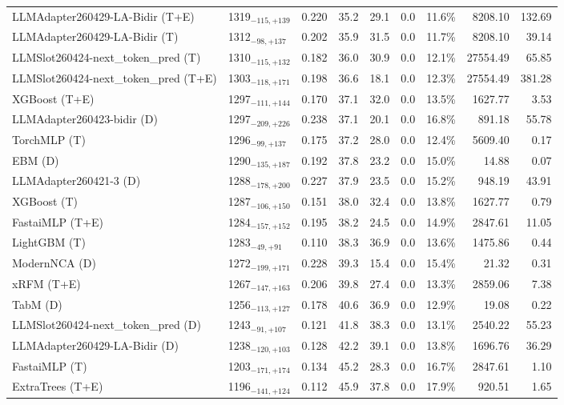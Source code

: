 \begin{tabular}{llcccccrr}
LLMAdapter260429-LA-Bidir (T+E) & 1319${}_{-115,+139}$ & 0.220 & 35.2 & 29.1 & 0.0 & 11.6\% & 8208.10 & 132.69 \\
LLMAdapter260429-LA-Bidir (T) & 1312${}_{-98,+137}$ & 0.202 & 35.9 & 31.5 & 0.0 & 11.7\% & 8208.10 & 39.14 \\
LLMSlot260424-next_token_pred (T) & 1310${}_{-115,+132}$ & 0.182 & 36.0 & 30.9 & 0.0 & 12.1\% & 27554.49 & 65.85 \\
LLMSlot260424-next_token_pred (T+E) & 1303${}_{-118,+171}$ & 0.198 & 36.6 & 18.1 & 0.0 & 12.3\% & 27554.49 & 381.28 \\
XGBoost (T+E) & 1297${}_{-111,+144}$ & 0.170 & 37.1 & 32.0 & 0.0 & 13.5\% & 1627.77 & 3.53 \\
LLMAdapter260423-bidir (D) & 1297${}_{-209,+226}$ & 0.238 & 37.1 & 20.1 & 0.0 & 16.8\% & 891.18 & 55.78 \\
TorchMLP (T) & 1296${}_{-99,+137}$ & 0.175 & 37.2 & 28.0 & 0.0 & 12.4\% & 5609.40 & 0.17 \\
EBM (D) & 1290${}_{-135,+187}$ & 0.192 & 37.8 & 23.2 & 0.0 & 15.0\% & 14.88 & 0.07 \\
LLMAdapter260421-3 (D) & 1288${}_{-178,+200}$ & 0.227 & 37.9 & 23.5 & 0.0 & 15.2\% & 948.19 & 43.91 \\
XGBoost (T) & 1287${}_{-106,+150}$ & 0.151 & 38.0 & 32.4 & 0.0 & 13.8\% & 1627.77 & 0.79 \\
FastaiMLP (T+E) & 1284${}_{-157,+152}$ & 0.195 & 38.2 & 24.5 & 0.0 & 14.9\% & 2847.61 & 11.05 \\
LightGBM (T) & 1283${}_{-49,+91}$ & 0.110 & 38.3 & 36.9 & 0.0 & 13.6\% & 1475.86 & 0.44 \\
ModernNCA (D) & 1272${}_{-199,+171}$ & 0.228 & 39.3 & 15.4 & 0.0 & 15.4\% & 21.32 & 0.31 \\
xRFM (T+E) & 1267${}_{-147,+163}$ & 0.206 & 39.8 & 27.4 & 0.0 & 13.3\% & 2859.06 & 7.38 \\
TabM (D) & 1256${}_{-113,+127}$ & 0.178 & 40.6 & 36.9 & 0.0 & 12.9\% & 19.08 & 0.22 \\
LLMSlot260424-next_token_pred (D) & 1243${}_{-91,+107}$ & 0.121 & 41.8 & 38.3 & 0.0 & 13.1\% & 2540.22 & 55.23 \\
LLMAdapter260429-LA-Bidir (D) & 1238${}_{-120,+103}$ & 0.128 & 42.2 & 39.1 & 0.0 & 13.8\% & 1696.76 & 36.29 \\
FastaiMLP (T) & 1203${}_{-171,+174}$ & 0.134 & 45.2 & 28.3 & 0.0 & 16.7\% & 2847.61 & 1.10 \\
ExtraTrees (T+E) & 1196${}_{-141,+124}$ & 0.112 & 45.9 & 37.8 & 0.0 & 17.9\% & 920.51 & 1.65 \\

\end{tabular}
